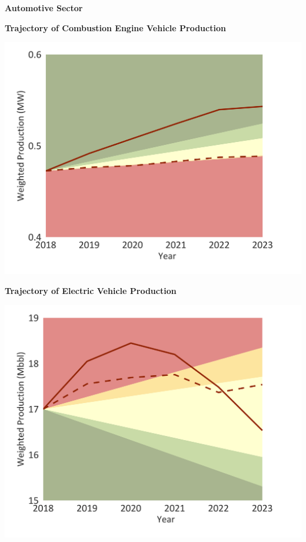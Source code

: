 \documentclass[10pt,table,a4]{article}\usepackage[]{graphicx}\usepackage[]{color}
\begin{document}
		
		\begin{center}
			\textbf{Automotive Sector}
		\end{center}
		
		\begin{minipage}[t]{.49\linewidth}
			\textbf{Trajectory of Combustion Engine Vehicle Production}
	
			\includegraphics[trim = {0 0cm 0 0},width=1\linewidth]{CAFigures/Fig20}
			
		\end{minipage}	
		\hspace{.02\linewidth}
		\begin{minipage}[t]{.49\textwidth}
			\textbf{Trajectory of Electric Vehicle Production}
			
			\includegraphics[trim = {0 0cm 0 0},width=1\linewidth]{CAFigures/Fig21}
			
		\end{minipage}		
		
\end{document}
